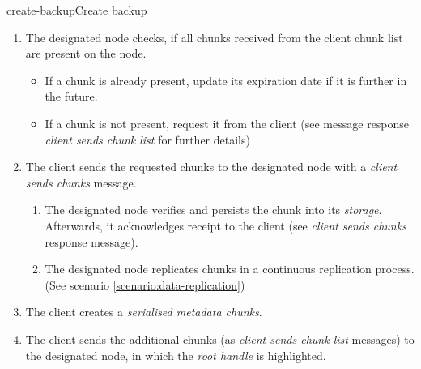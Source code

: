 \begin{scenario}{create-backup}{Create backup}
\begin{enumerate}
\begin{enumerate}
   				\item The designated node checks, if all chunks received from the client chunk list are present on the node.
   					\begin{itemize}
   						\item If a chunk is already present, update its expiration date if it is further in the future.
   						\item If a chunk is not present, request it from the client (see message response \emph{client sends chunk list} for further details)
   					\end{itemize}
   				\item The client sends the requested chunks to the designated node with a \emph{client sends chunks} message. %
   					\begin{enumerate}
   						\item The designated node verifies and persists the chunk into its \emph{storage}. Afterwards, it acknowledges receipt to the client (see \emph{client sends chunks} response message).
   						\item The designated node replicates chunks in a continuous replication process. (See scenario \ref{scenario:data-replication})
   					\end{enumerate}
   				\item The client creates a \emph{serialised metadata chunks}. %
   				\item The client sends the additional chunks (as \emph{client sends chunk list} messages) to the designated node, in which the \emph{root handle} is highlighted. %
   			\end{enumerate}
    \end{enumerate}
    

\end{scenario}
